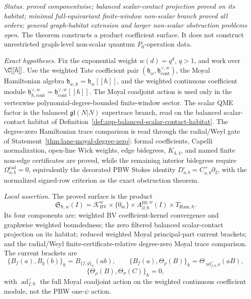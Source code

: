 \begin{stmt}\label{thm:lane-quantum-coefficient-surface}
  \emph{Status.} \emph{proved componentwise; balanced scalar-contact
  projection proved on its habitat; minimal full-equivariant
  finite-window non-scalar branch proved all orders; general
  graph-habitat extension and larger non-scalar obstruction problems
  open}.  The theorem constructs a product coefficient surface.  It does
  not construct unrestricted graph-level non-scalar quantum
  \(P_0\)-operation data.

  \emph{Exact hypotheses.} Fix the exponential weight \(w(d)=q^d\),
  \(q>1\), and work over \(\C[[\hbar]]\).  Use the weighted Tate
  coefficient pair
  \((\mathfrak h_w,\mathfrak h^{\vee,w}_{\mathrm{cont}})\), the
  Moyal Hamiltonian algebra \(\mathfrak h_{w,\hbar}=\mathfrak h_w[[\hbar]]\),
  and the weighted continuous coefficient module
  \(\mathfrak h^{\vee,w}_{\hbar,\mathrm{cont}}
  =\mathfrak h^{\vee,w}_{\mathrm{cont}}[[\hbar]]\).
  The Moyal coadjoint action is used only in the vertexwise
  polynomial-degree-bounded finite-window sector.  The scalar QME factor
  is the balanced \(\mathfrak{gl}(N|N)\) supertrace branch, read on the
  balanced scalar-contact habitat of
  Definition~\ref{def:app-balanced-scalar-contact-habitat}.  The
  degree-zero Hamiltonian trace comparison is read through the
  radial/Weyl gate of Statement~\ref{thm:lane-moyal-degree-zero}: formal
  coefficients, Capelli normalization, open-line Wick weights, edge
  bidegrees, \(K_{4,4}\), and named finite non-edge certificates are
  proved, while the remaining interior bidegrees require
  \(\Omega^{\mathrm{rad}}_{a,b}=0\), equivalently the decorated PBW
  Stokes identity \(D^\square_{a,b}=C^+_{a,b}\partial_2\), with the
  normalized signed-row criterion as the exact obstruction theorem.

  \emph{Local assertion.} The proved surface is the product
  \[
    \mathfrak S_{\hbar,w}(I)
      =
      \mathcal K_{\mathrm{BV}}^w
      \times\{0_{\mathrm{sc}}\}
      \times A^{\mathrm{pp},w}_{\partial,\hbar}(I)
      \times T_{\mathrm{Ham},\hbar}.
  \]
  Its four components are: weighted BV coefficient-kernel convergence
  and graphwise weighted boundedness; the zero filtered balanced
  scalar-contact projection on its habitat; reduced weighted Moyal
  principal-part current brackets; and the radial/Weyl
  finite-certificate-relative degree-zero Moyal trace comparison.  The
  current
  brackets are
  \[
    \{B_f(a),B_g(b)\}_\hbar
      =B_{\{f,g\}_\hbar}(ab),\qquad
    \{B_f(a),\Theta_\rho(B)\}_\hbar
      =\Theta_{\operatorname{ad}^{\vee}_{f,\hbar}\rho}(aB),
  \]
  \[
    \{\Theta_\rho(B),\Theta_\sigma(C)\}_\hbar=0,
  \]
  with \(\operatorname{ad}^{\vee}_{f,\hbar}\) the full Moyal coadjoint
  action on the weighted continuous coefficient module, not the PBW
  one-\(\psi\) action.


\end{stmt}
